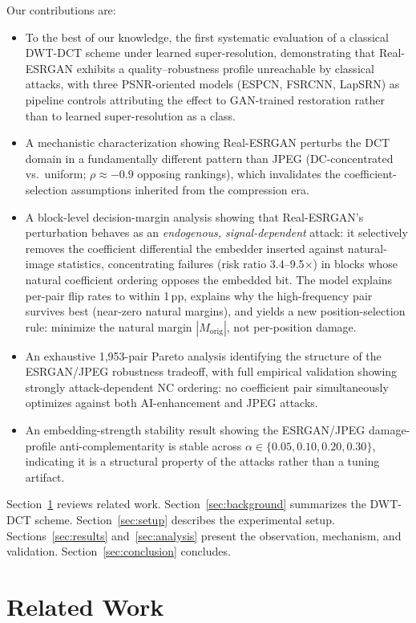 \documentclass[conference]{IEEEtran}
\begin{document}
Our contributions are:
\begin{itemize}
\item To the best of our knowledge, the first systematic evaluation of
a classical DWT-DCT scheme under learned super-resolution, demonstrating
that Real-ESRGAN exhibits a quality--robustness profile unreachable by
classical attacks, with three PSNR-oriented models (ESPCN, FSRCNN,
LapSRN) as pipeline controls attributing the effect to GAN-trained
restoration rather than to learned super-resolution as a class.
\item A mechanistic characterization showing Real-ESRGAN perturbs the
DCT domain in a fundamentally different pattern than JPEG (DC-concentrated
vs.\ uniform; $\rho \approx -0.9$ opposing rankings), which invalidates
the coefficient-selection assumptions inherited from the compression era.
\item A block-level decision-margin analysis showing that Real-ESRGAN's
perturbation behaves as an \emph{endogenous, signal-dependent} attack:
it selectively removes the coefficient differential the embedder
inserted against natural-image statistics, concentrating failures (risk
ratio 3.4--9.5$\times$) in blocks whose natural coefficient ordering
opposes the embedded bit. The model explains per-pair flip rates to within
1\,pp, explains why the high-frequency pair survives best (near-zero
natural margins), and yields a new position-selection rule: minimize the
natural margin $|M_{\mathrm{orig}}|$, not per-position damage.
\item An exhaustive 1,953-pair Pareto analysis identifying the structure
of the ESRGAN/JPEG robustness tradeoff, with full empirical validation
showing strongly attack-dependent NC ordering: no coefficient pair
simultaneously optimizes against both AI-enhancement and JPEG attacks.
\item An embedding-strength stability result showing the ESRGAN/JPEG
damage-profile anti-complementarity is stable across
$\alpha \in \{0.05, 0.10, 0.20, 0.30\}$, indicating it is a structural
property of the attacks rather than a tuning artifact.
\end{itemize}

Section~\ref{sec:related} reviews related work.
Section~\ref{sec:background} summarizes the DWT-DCT scheme.
Section~\ref{sec:setup} describes the experimental setup.
Sections~\ref{sec:results} and~\ref{sec:analysis} present the
observation, mechanism, and validation. Section~\ref{sec:conclusion}
concludes.

\section{Related Work}
\label{sec:related}
\end{document}

